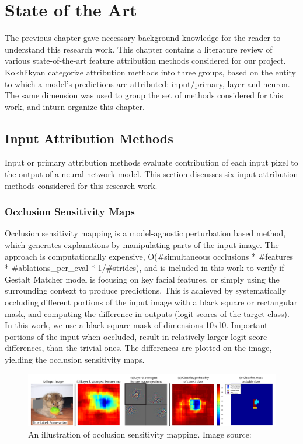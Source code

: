 \documentclass[../report.tex]{subfiles}
\begin{document}
    \chapter{State of the Art}
	The previous chapter gave necessary background knowledge for the reader to understand this research work. This chapter contains a literature review of various state-of-the-art feature attribution methods considered for our project. Kokhlikyan \etal \cite{kokhlikyan2020captum} categorize attribution methods into three groups, based on the entity to which a model's predictions are attributed: input/primary, layer and neuron. The same dimension was used to group the set of methods considered for this work, and inturn organize this chapter.
 
    \section{Input Attribution Methods}
    Input or primary attribution methods evaluate contribution of each input pixel to the output of a neural network model. This section discusses six input attribution methods considered for this research work.
    \subsection{Occlusion Sensitivity Maps}
    Occlusion sensitivity mapping \cite{matthew2014visualizing} is a model-agnostic perturbation based method, which generates explanations by manipulating parts of the input image. The approach is computationally expensive, O(\#simultaneous occlusions * \#features * \#ablations\_per\_eval * 1/\#strides), and is included in this work to verify if Gestalt Matcher model is focusing on key facial features, or simply using the surrounding context to produce predictions. This is achieved by systematically occluding different portions of the input image with a black square or rectangular mask, and computing the difference in outputs (logit scores of the target class). In this work, we use a  black square mask of dimensions 10x10. Important portions of the input when occluded, result in relatively larger logit score differences, than the trivial ones. The differences are plotted on the image, yielding the occlusion sensitivity maps.
    
    \begin{figure}[H]
    	\includegraphics[width=\textwidth]{images/occlusion_sensitivity_map}
    	\caption{An illustration of occlusion sensitivity mapping. Image source: \cite{matthew2014visualizing}}
    	\label{osm}
    \end{figure}
    
\end{document}
